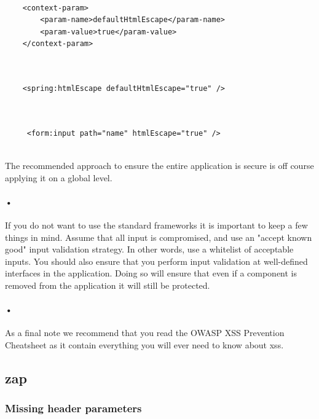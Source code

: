 \documentclass[11pt,english,a4paper]{report}
\begin{document}
\begin{lstlisting}[caption=Escape input in web.xml file, label=globallevel]

	<context-param>
		<param-name>defaultHtmlEscape</param-name>
		<param-value>true</param-value>
	</context-param>
	
\end{lstlisting}

\begin{lstlisting}[caption=Escape input on a page level, label=pagelevel]

	<spring:htmlEscape defaultHtmlEscape="true" />
		
\end{lstlisting}

\begin{lstlisting}[caption=Escape input on a specific input field, label=formlevel]

	 <form:input path="name" htmlEscape="true" />
	
\end{lstlisting}

The recommended approach to ensure the entire application is secure is off course applying it on a global level.

\paragraph{•}
If you do not want to use the standard frameworks it is important to keep a few things in mind.
Assume that all input is compromised, and use an "accept known good" input validation strategy.
In other words, use a whitelist of acceptable inputs.
You should also ensure that you perform input validation at well-defined interfaces in the application.
Doing so will ensure that even if a component is removed from the application it will still be protected.

\paragraph{•}
As a final note we recommend that you read the OWASP XSS Prevention Cheatsheet\cite{cheatsheet} as it contain everything you will ever need to know about \gls{xss}. 

\subsection{\gls{zap}}

\subsubsection{Missing header parameters}
\end{document}
